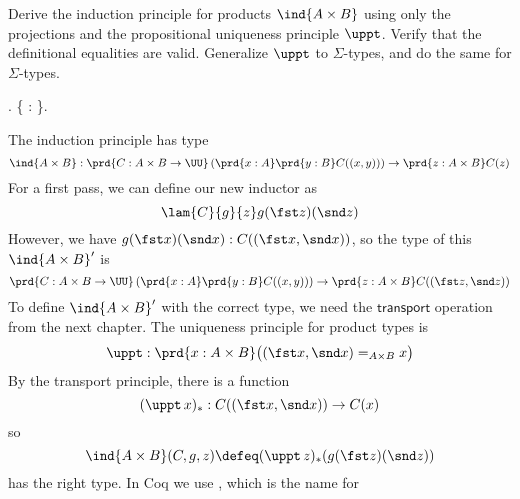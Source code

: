 Derive the induction principle for products $\ind{A \times B}$ using only the
    projections and the propositional uniqueness principle $\uppt$.  Verify that
    the definitional equalities are valid.  Generalize $\uppt$ to $\Sigma$-types,
    and do the same for $\Sigma$-types. \begin{coqdoccode}
\coqdocemptyline
\coqdocnoindent
{} .\coqdoceol
\coqdocindent{1.00em}
 \{  : \}.\coqdoceol
\coqdocemptyline
\end{coqdoccode}
\soln 
The induction principle has type
\[
  \ind{A\times B} : \prd{C: A\times B \to \UU}\left(\prd{x:A}\prd{y:B}C((x,
    y))\right) \to \prd{z:A\times B}C(z)
\]
For a first pass, we can define our new inductor as
\[
  \lam{C}{g}{z}g(\fst z)(\snd z)
\]
However, we have $g(\fst x)(\snd x) : C((\fst x, \snd x))$, so the type of this
$\ind{A \times B}'$ is
\[
  \prd{C: A\times B \to \UU}\left(\prd{x:A}\prd{y:B}C((x,
    y))\right) \to \prd{z:A\times B}C((\fst z, \snd z))
    \]
To define $\ind{A \times B}'$ with the correct type, we need the
$\mathsf{transport}$ operation from the next chapter.  The uniqueness principle
for product types is
\[
  \uppt : \prd{x : A \times B} \big((\fst x, \snd x) =_{A \times B} x\big)
\]
By the transport principle, there is a function
\[
  (\uppt\, x)_{*} : C((\fst x, \snd x)) \to C(x)
\]
so
\[
  \ind{A \times B}(C, g, z)
  \defeq
  (\uppt\, z)_{*}(g(\fst z)(\snd z))
\]
has the right type.  In Coq we use , which is the name for
